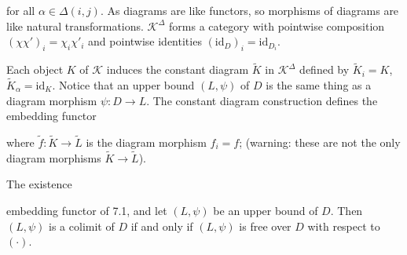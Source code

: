 for all $\alpha \in \Delta(i, j)$. As diagrams are like functors, so morphisms of diagrams are like natural transformations. $\mathcal{K}^{\Delta}$ forms a category with pointwise composition $(\chi \chi')_i = \chi_i \chi'_i$ and pointwise identities $(\mathrm{id}_D)_i = \mathrm{id}_{D_i}$.

Each object $K$ of $\mathcal{K}$ induces the constant diagram $\tilde{K}$ in $\mathcal{K}^{\Delta}$ defined by $\tilde{K}_i = K$, $\tilde{K}_{\alpha} = \mathrm{id}_K$. Notice that an upper bound $(L, \psi)$ of $D$ is the same thing as a diagram morphism $\psi: D \longrightarrow L$. The constant diagram construction defines the embedding functor

where $\tilde{f} \colon \tilde{K} \longrightarrow \tilde{L}$ is the diagram morphism $f_i = f$; (warning: these are not the only diagram morphisms $\tilde{K} \longrightarrow \tilde{L}$).

The existence

embedding functor of 7.1, and let $(L, \psi)$ be an upper bound of $D$. Then $(L, \psi)$ is a colimit of $D$ if and only if $(L, \psi)$ is free over $D$ with respect to $(\cdot)$.
